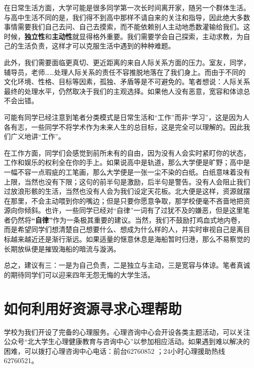 \documentclass[11pt,oneside]{book}
\begin{document}
在日常生活方面，大学可能是很多同学第一次长时间离开家，随另一个群体生活。与高中生活不同的是，我们得不到高中那样不请自来的关注和指导，因此绝大多数事情需要我们自己去问、自己去摸索，而不能依赖别人主动地悉数灌输给我们。这时候，\textbf{独立性}和\textbf{主动性}就显得格外重要。我们需要学会自己探索，主动求教，为自己的生活负责，这样才可以克服生活中遇到的种种难题。

\vspace{10pt}

此外，我们需要面临更真切、更近距离的来自人际关系方面的压力。室友，同学，辅导员，老师……处理人际关系的责任不容推脱地落在了我们身上。而由于不同的文化环境、性格、目标等因素，孤独、矛盾等是不可避免的。笔者想说：人际关系最终的处理水平，仍然取决于我们的主观选择。如果他人没有恶意，宽容和体谅总不会出错。

\vspace{10pt}

可能有同学已经注意到笔者分类模式是日常生活和“工作”而非“学习”，这是因为人各有志，一些同学不将学术作为未来人生的总目标，这是完全可以理解的。因此我们广义地讲“工作”。

\vspace{10pt}

在工作方面，同学们会感觉到前所未有的自由，因为没有人会实时紧盯你的状态，工作和娱乐的权利全在你的手上。如果说高中是轨道，那么大学便是旷野；高中是一幅不容一点瑕疵的工笔画，那么大学便是一张一尘不染的白纸。白纸意味着没有上限，当然也没有下限；这句的前半句是激励，后半句是警告。没有人会阻止我们过放浪形骸的生活，当然也没有人会为我们设定天花板。北大便是这样，资源就摆在那里，不会主动喂到你的嘴边；但是只要你愿意争取，那学校便毫不吝啬地把资源向你倾斜。也许，一些同学已经对“自律”一词有了过犹不及的嫌恶，但是这里笔者仍然将\textbf{“自律”}作为一条极其重要的建议。当然，我们不鼓励打鸡血式地内卷，而是希望同学们想清楚自己想要什么、想成为什么样的人，并实时审视自己是离目标越来越近还是渐行渐远。如果适量的惬意休息是海船暂时归港，那么不易察觉的长期放纵便是摧毁海船的暗流与漩涡。

\vspace{10pt}

总之，建议有三：一是为自己负责，二是独立与主动，三是宽容与体谅。笔者真诚的期待同学们可以迎来四年无怨无悔的大学生活。

\section{如何利用好资源寻求心理帮助}
学校为我们开设了完备的心理服务。心理咨询中心会开设各类主题活动，可以关注公众号“北大学生心理健康教育与咨询中心”以参加相应活动。如果遇到难以解决的困难，可以拨打心理咨询中心电话：前台62760852 ；24小时心理援助热线62760521。
\end{document}
